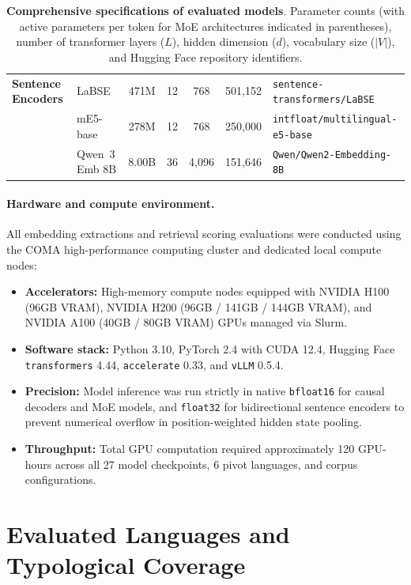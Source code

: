 \begin{table}[H]
{\begin{tabular}{@{}llccccp{5cm}@{}}
\midrule
\textbf{Sentence Encoders} 
  & LaBSE & 471M & 12 & 768 & 501,152 & \texttt{sentence-transformers/LaBSE} \\
  & mE5-base & 278M & 12 & 768 & 250,000 & \texttt{intfloat/multilingual-e5-base} \\
  & Qwen~3 Emb 8B & 8.00B & 36 & 4,096 & 151,646 & \texttt{Qwen/Qwen2-Embedding-8B} \\
\bottomrule
\end{tabular}%
}
\caption{\textbf{Comprehensive specifications of evaluated models}. Parameter counts (with active parameters per token for MoE architectures indicated in parentheses), number of transformer layers ($L$), hidden dimension ($d$), vocabulary size ($|V|$), and Hugging Face repository identifiers.}
\label{tab:appendix-model-specs}
\end{table}

\paragraph{Hardware and compute environment.}
All embedding extractions and retrieval scoring evaluations were conducted using the COMA high-performance computing cluster and dedicated local compute nodes:
\begin{itemize}
    \item \textbf{Accelerators:} High-memory compute nodes equipped with NVIDIA H100 (96GB VRAM), NVIDIA H200 (96GB / 141GB / 144GB VRAM), and NVIDIA A100 (40GB / 80GB VRAM) GPUs managed via Slurm.
    \item \textbf{Software stack:} Python 3.10, PyTorch 2.4 with CUDA 12.4, Hugging Face \texttt{transformers} 4.44, \texttt{accelerate} 0.33, and \texttt{vLLM} 0.5.4.
    \item \textbf{Precision:} Model inference was run strictly in native \texttt{bfloat16} for causal decoders and MoE models, and \texttt{float32} for bidirectional sentence encoders to prevent numerical overflow in position-weighted hidden state pooling.
    \item \textbf{Throughput:} Total GPU computation required approximately 120 GPU-hours across all 27 model checkpoints, 6 pivot languages, and corpus configurations.
\end{itemize}

\clearpage
\section{Evaluated Languages and Typological Coverage}
\label{sec:appendix-languages}

